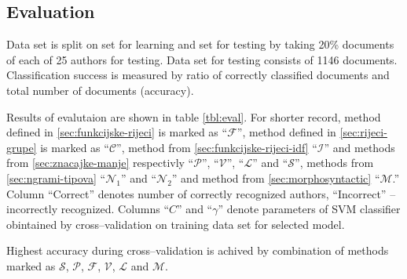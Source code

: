 \documentclass[11pt,english]{article}
\begin{document}
\begin{multicols}{2}
\section{Evaluation}
\label{sec:evaluacija}
Data set is split on set for learning and set for testing by taking 20\%
documents of each of 25 authors for testing. Data set for testing consists of
1146 documents. Classification success is measured by ratio of correctly
classified documents and total number of documents (accuracy).

Results of evalutaion are shown in table \ref{tbl:eval}. For shorter record,
method defined in \ref{sec:funkcijske-rijeci} is marked as ``$\mathcal{F}$'', method
defined in \ref{sec:rijeci-grupe} is marked as ``$\mathcal{C}$'',
method from \ref{sec:funkcijske-rijeci-idf} ``$\mathcal{I}$'' and methods from
\ref{sec:znacajke-manje} respectivly ``$\mathcal{P}$'', ``$\mathcal{V}$'', 
``$\mathcal{L}$'' and ``$\mathcal{S}$'', methods from \ref{sec:ngrami-tipova}
``$\mathcal{N}_1$'' and ``$\mathcal{N}_2$'' and method from
\ref{sec:morphosyntactic} ``$\mathcal{M}$.'' Column ``Correct'' denotes number
of correctly recognized authors, ``Incorrect'' -- incorrectly recognized.
Columns ``$C$'' and ``$\gamma$'' denote parameters of SVM classifier obintained
by cross--validation on training data set for selected model.

Highest accuracy during cross--validation is achived by combination of
methods marked as $\mathcal{S}$, $\mathcal{P}$, $\mathcal{F}$, $\mathcal{V}$,
$\mathcal{L}$ and $\mathcal{M}$.

% 
% 


\end{multicols}
\end{document}
